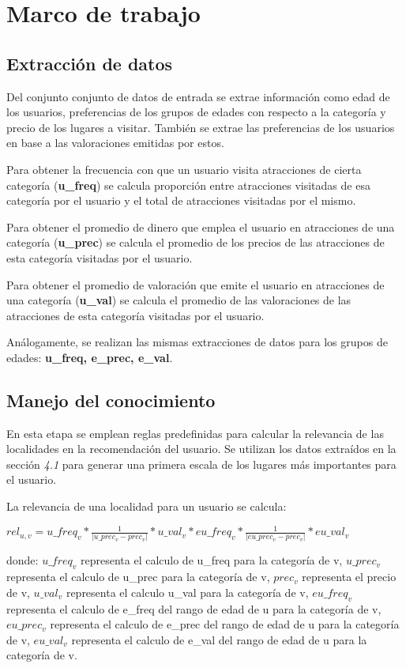 \documentclass[runningheads]{llncs}
\begin{document}
\section{Marco de trabajo}

\subsection{Extracción de datos}
Del conjunto conjunto de datos de entrada se extrae información como edad de los usuarios, preferencias de los grupos de edades con respecto a la categoría y precio de los lugares a visitar. También se extrae las preferencias de los usuarios en base a las valoraciones emitidas por estos.

Para obtener la frecuencia  con que un usuario visita atracciones de cierta categoría (\textbf{u\_freq}) se calcula proporción entre atracciones visitadas de esa categoría por el usuario y el total de atracciones visitadas por el mismo.

Para obtener el promedio de dinero que emplea el usuario en atracciones de una categoría (\textbf{u\_prec}) se calcula el promedio de los precios de las atracciones de esta categoría visitadas por el usuario.

Para obtener el promedio de valoración que emite el usuario en atracciones de una categoría (\textbf{u\_val}) se calcula el promedio de las valoraciones de las atracciones de esta categoría visitadas por el usuario.

Análogamente, se realizan las mismas extracciones de datos para los grupos de edades: \textbf{u\_freq, e\_prec, e\_val}.

\subsection{Manejo del conocimiento}
En esta etapa se emplean reglas predefinidas para calcular la relevancia de las localidades en la recomendación del usuario. Se utilizan los datos extraídos en la sección \textit{4.1} para generar una primera escala de los lugares más importantes para el usuario. 

La relevancia de una localidad para un usuario se calcula:

$rel_{u,v} = u\_freq_{v} * \frac{1}{|u\_prec_{v}- prec_v|}  * u\_val_{v} * eu\_freq_{v} *  \frac{1}{|eu\_prec_{v}- prec_v|} * eu\_val_{v}$

donde: $u\_freq_{v}$ representa el calculo de u\_freq para la categoría de v, $u\_prec_{v}$ representa el calculo de u\_prec para la categoría de v, $prec_v$ representa el precio de v, $u\_val_{v}$ representa el calculo u\_val para la categoría de v, $eu\_freq_{v}$ representa el calculo de e\_freq del rango de edad de u para la categoría de v, $eu\_prec_{v}$ representa el calculo de e\_prec del rango de edad de u para la categoría de v, $eu\_val_{v}$ representa el calculo de e\_val del rango de edad de u para la categoría de v.
\end{document}
